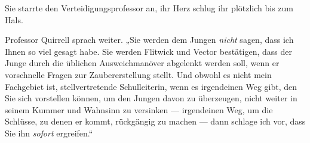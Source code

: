 Sie starrte den Verteidigungsprofessor an, ihr Herz schlug ihr plötzlich bis zum Hals.

Professor Quirrell sprach weiter.
„Sie werden dem Jungen \emph{nicht} sagen, dass ich Ihnen so viel gesagt habe. Sie werden Flitwick und Vector bestätigen, dass der Junge durch die üblichen Ausweichmanöver abgelenkt werden soll, wenn er vorschnelle Fragen zur Zaubererstellung stellt. Und obwohl es nicht mein Fachgebiet ist, stellvertretende Schulleiterin, wenn es irgendeinen Weg gibt, den Sie sich vorstellen können, um den Jungen davon zu überzeugen, nicht weiter in seinem Kummer und Wahnsinn zu versinken — irgendeinen Weg, um die Schlüsse, zu denen er kommt, rückgängig zu machen — dann schlage ich vor, dass Sie ihn \emph{sofort} ergreifen.“
